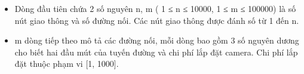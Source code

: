 \begin{itemize}
	\item     Dòng đầu tiên chứa 2 số nguyên n, m ( 1 ≤ n ≤ 10000, 1 ≤ m ≤ 100000)  là số nút giao thông và số đường nối. Các nút giao thông được đánh số từ 1 đến n.   
	\item     m dòng tiếp theo mô tả các đường nối, mỗi dòng bao gồm 3 số nguyên dương cho biết hai đầu mút của tuyến đường và chi phí lắp đặt camera. Chi phí lắp đặt thuộc phạm vi [1, 1000].   
\end{itemize}